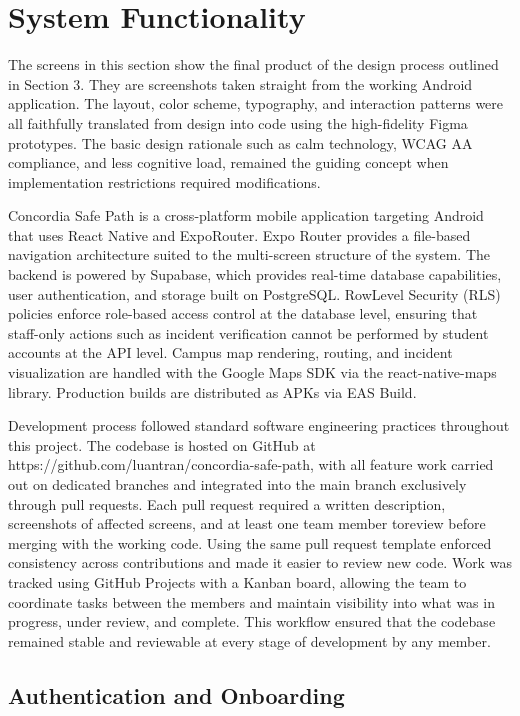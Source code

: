 \documentclass[sigconf]{acmart}
\begin{document}
\section{System Functionality}
\label{sec:functionality}
 
The screens in this section show the final product of the design process outlined in Section 3. They are screenshots taken straight from the working Android application. The layout, color scheme, typography, and interaction patterns were all faithfully translated from design into code using the high-fidelity Figma prototypes. The basic design rationale such as calm technology, WCAG AA compliance, and less cognitive load, remained the guiding concept when implementation restrictions required modifications.
 
Concordia Safe Path is a cross-platform mobile application targeting Android that uses React Native and ExpoRouter. Expo Router provides a file-based navigation architecture suited to the multi-screen structure of the system. The backend is powered by Supabase, which provides real-time database capabilities, user authentication, and storage built on PostgreSQL. RowLevel Security (RLS) policies enforce role-based access control at the database level, ensuring that staff-only actions such as incident verification cannot be performed by student accounts at the API level. Campus map rendering, routing, and incident visualization are handled with the Google Maps SDK via the react-native-maps library. Production builds are distributed as APKs via EAS Build.
 
Development process followed standard software engineering practices throughout this project. The codebase is hosted on GitHub at https://github.com/luantran/concordia-safe-path, with all feature work carried out on dedicated branches and integrated into the main branch exclusively through pull requests. Each pull request required a written description, screenshots of affected screens, and at least one team member toreview before merging with the working code. Using the same pull request template enforced consistency across contributions and made it easier to review new code.  Work was tracked using GitHub Projects with a Kanban board, allowing the team to coordinate tasks between the members and maintain visibility into what was in progress, under review, and complete. This workflow ensured that the codebase remained stable and reviewable at every stage of development by any member. 
\subsection{Authentication and Onboarding}
 
\end{document}
